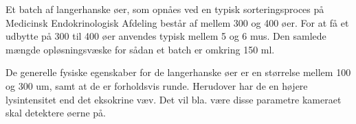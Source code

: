 Et batch af langerhanske øer, som opnåes ved en typisk sorteringsproces på Medicinsk Endokrinologisk Afdeling består af mellem 300 og 400 øer. For at få et udbytte på 300 til 400 øer anvendes typisk mellem 5 og 6 mus. Den samlede mængde opløsningsvæske for sådan et batch er omkring 150 ml.

De generelle fysiske egenskaber for de langerhanske øer er en størrelse mellem 100 og 300 um, samt at de er forholdsvis runde. Herudover har de en højere lysintensitet end det eksokrine væv. Det vil bla. være disse parametre kameraet skal detektere øerne på.





